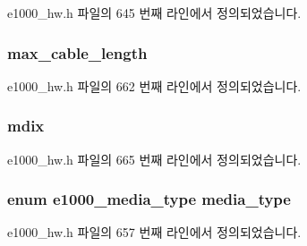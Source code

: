 e1000\+\_\+hw.\+h 파일의 645 번째 라인에서 정의되었습니다.

\subsubsection[{\texorpdfstring{max\+\_\+cable\+\_\+length}{max_cable_length}}]{ max\+\_\+cable\+\_\+length}\hypertarget{structe1000__phy__info_a15f3c3e10e8d5fdb46385202e8cf1f8c}{}\label{structe1000__phy__info_a15f3c3e10e8d5fdb46385202e8cf1f8c}


e1000\+\_\+hw.\+h 파일의 662 번째 라인에서 정의되었습니다.

\subsubsection[{\texorpdfstring{mdix}{mdix}}]{ mdix}\hypertarget{structe1000__phy__info_a40f0303bb287bcde723a46b57efb9ca1}{}\label{structe1000__phy__info_a40f0303bb287bcde723a46b57efb9ca1}


e1000\+\_\+hw.\+h 파일의 665 번째 라인에서 정의되었습니다.

\subsubsection[{\texorpdfstring{media\+\_\+type}{media_type}}]{\setlength{\rightskip}{0pt plus 5cm}enum {\bf e1000\+\_\+media\+\_\+type} media\+\_\+type}\hypertarget{structe1000__phy__info_a6746876596daee9682d6aaba1a4b65fc}{}\label{structe1000__phy__info_a6746876596daee9682d6aaba1a4b65fc}


e1000\+\_\+hw.\+h 파일의 657 번째 라인에서 정의되었습니다.

